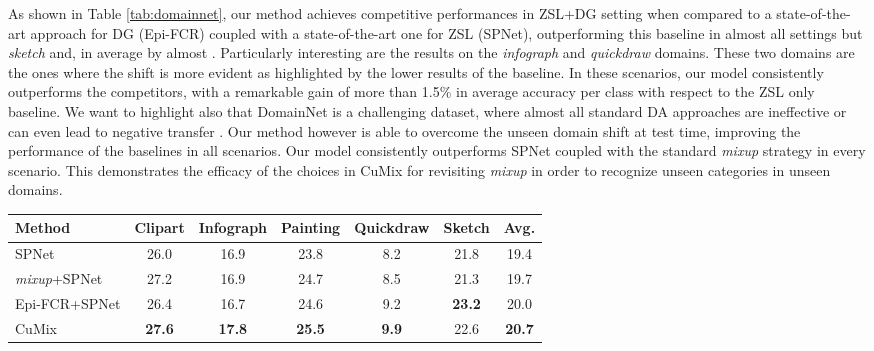 \documentclass[runningheads]{llncs}
\newcommand{\methodName}{{CuMix} }
\begin{document}
As shown in Table \ref{tab:domainnet}, our method achieves competitive performances in ZSL+DG setting when compared to a state-of-the-art approach for DG (Epi-FCR) coupled with a state-of-the-art one for ZSL (SPNet), outperforming this baseline in almost all settings but \textit{sketch} and, in average by almost . Particularly interesting are the results on the \textit{infograph} and \textit{quickdraw} domains. These two domains are the ones where the shift is more evident as highlighted by the lower results of the baseline. In these scenarios, our model consistently outperforms the competitors, with a remarkable gain of more than 1.5\% in average accuracy per class with respect to the ZSL only baseline. We want to highlight also that DomainNet is a challenging dataset, where almost all standard DA approaches are ineffective or can even lead to negative transfer \cite{peng2019moment}. Our method however is able to overcome the unseen domain shift at test time, improving the performance of the baselines in all scenarios. Our model consistently outperforms SPNet coupled with the standard \textit{mixup} strategy in every scenario. This demonstrates the efficacy of the choices in \methodName for revisiting \textit{mixup} in order to recognize unseen categories in unseen domains.

\begin{table*}[t]
			\caption{ZSL+DG scenario on the DomainNet dataset with ResNet-50 as backbone.} 
		\centering
		
		{\small
		\begin{tabular}{ l |  c  c  c  c  c | c   }
		Method&Clipart&Infograph&Painting&Quickdraw&Sketch&Avg.\\
		\hline
                             SPNet    &{26.0}  &16.9  & 23.8 & 8.2  & 21.8  &19.4 \\
		                           \textit{mixup}+SPNet    &27.2  &16.9  & 24.7 & 8.5  & 21.3  & 19.7\\
		
        \multirow{1}{*}{Epi-FCR+SPNet}
                               &{26.4} & 16.7  & 24.6  & 9.2 & \textbf{23.2}    &20.0\\
        \hline
        \methodName    
                                     &\textbf{27.6} &\textbf{17.8}  & \textbf{25.5}  & \textbf{9.9}  &{22.6}  & \textbf{20.7}  \\
		\end{tabular}}
		\label{tab:domainnet}
\end{table*}
\end{document}
